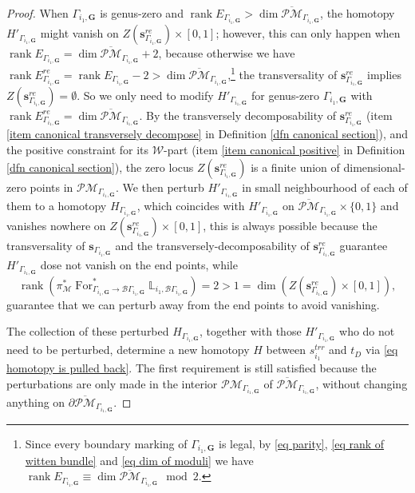 \documentclass[11pt]{amsart}
\theoremstyle{definition}
\theoremstyle{remark}
\newcommand{\oPMb}{{\overline{\mathcal{PM}}}}
\newcommand{\nontilde}{}
\newcommand{\<}{\left<}
\renewcommand{\>}{\right>}
\numberwithin{equation}{section}
\DeclareMathOperator{\rk}{rank}
\begin{document}
\begin{proof}
        When $\Gamma_{i_1,\bm{G}}$ is genus-zero and $\rk E_{\Gamma_{i_1,\bm{G}}}> \dim \oPMb_{\Gamma_{i_1,\bm{G}}}$, the homotopy $H'_{\Gamma_{i_1,\bm{G}}}$ might vanish on $Z\left(\bm{s}^{re}_{\Gamma_{i_1,\bm{G}}}\right)\times [0,1]$; however, this can only happen when  $\rk E_{\Gamma_{i_1,\bm{G}}}= \dim \oPMb_{\Gamma_{i_1,\bm{G}}}+2$, because otherwise we have  $\rk E^{re}_{\Gamma_{i_1,\bm{G}}}= \rk E_{\Gamma_{i_1,\bm{G}}}-2> \dim \oPMb_{\Gamma_{i_1,\bm{G}}}$,\footnote{Since every boundary marking of $\Gamma_{i_1,\bm{G}}$ is legal,  by \eqref{eq parity}, \eqref{eq rank of witten bundle} and \eqref{eq dim of moduli} we have $\rk E_{\Gamma_{i_1,\bm{G}}}\equiv \dim \oPMb_{\Gamma_{i_1,\bm{G}}} \mod 2$.} the transversality of $\bm{s}^{re}_{\Gamma_{i_1,\bm{G}}}$ implies $Z\left(\bm{s}^{re}_{\Gamma_{i_1,\bm{G}}}\right)=\emptyset$. So we only need to modify $H'_{\Gamma_{i_1,\bm{G}}}$ for genus-zero $\Gamma_{i_1,\bm{G}}$ with $\rk E^{re}_{\Gamma_{i_1,\bm{G}}}= \dim \oPMb_{\Gamma_{i_1,\bm{G}}}$. By the transversely decomposability of $\bm{s}^{re}_{\Gamma_{i_1,\bm{G}}}$ (item \ref{item canonical transversely decompose} in Definition \ref{dfn canonical section}), and the positive constraint for its $\mathcal W$-part (item \ref{item canonical positive} in Definition \ref{dfn canonical section}), the zero locus $Z\left(\bm{s}^{re}_{\Gamma_{i_1,\bm{G}}}\right)$ is a finite union of dimensional-zero points in $\mathcal{PM}_{\Gamma_{i_1,\bm{G}}}$. We then perturb $H'_{\Gamma_{i_1,\bm{G}}}$ in small neighbourhood of each of them to a homotopy $H_{\Gamma_{i_1,\bm{G}}}$, which coincides with $H'_{\Gamma_{i_1,\bm{G}}}$ on  $\oPMb_{\Gamma_{i_1,\bm{G}}}\times \{0,1\}$ and vanishes nowhere on $Z\left(\bm{s}^{re}_{\Gamma_{i_1,\bm{G}}}\right)\times [0,1]$, this is always possible because the transversality of $\bm{s}_{\Gamma_{i_1,\bm{G}}}$ and the transversely-decomposability of $\bm{s}^{re}_{\Gamma_{i_1,\bm{G}}}$ guarantee $H'_{\Gamma_{i_1,\bm{G}}}$ dose not vanish on the end points, while
        $$\rk \left(\pi^*_{\mathcal M} \operatorname{For}^*_{\Gamma_{i_1,\bm{G}}\to \mathcal B \Gamma_{i_1,\bm{G}}}\mathbb L_{i_1,\mathcal B \Gamma_{i_1,\bm{G}}}\right)=2>1=\dim \left(Z\left(\bm{s}^{re}_{\Gamma_{i_1,\bm{G}}}\right)\times [0,1]\right),$$
        guarantee that we can perturb away from the end points to avoid vanishing.
        
        The collection of these perturbed $H_{\Gamma_{i_1,\bm{G}}}$, together with those $H'_{\Gamma_{i_1,\bm{G}}}$ who do not need to be perturbed, determine  a new homotopy $H$ between $\nontilde{s}^{trr}_{i_1}$ and $t_D$ via \eqref{eq homotopy is pulled back}. The first requirement is still satisfied because the perturbations are only made in the interior  $\mathcal{PM}_{\Gamma_{i_1,\bm{G}}}$ of $\oPMb_{\Gamma_{i_1,\bm{G}}}$, without changing anything on $\partial\oPMb_{\Gamma_{i_1,\bm{G}}}$.


\end{proof}
\end{document}
